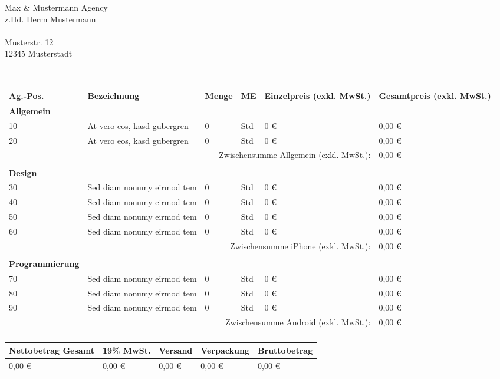 \documentclass[DIN, pagenumber=false, parskip=half,
               fromalign=right, fromphone=true, fromfax=false,
               fromrule=false]{scrlttr2}
\begin{document}
\begin{letter}{
	Max \& Mustermann Agency\\
	z.Hd. Herrn Mustermann\\ \ \\
	Musterstr. 12\\
	12345 Musterstadt
}

\opening{\ }
\vspace{-1.5cm}

\begin{longtable}{p{2.5cm}p{5.5cm}p{1cm}p{1cm}p{2.5cm}p{2.5cm}}
	\hline
	Ag.-Pos. & Bezeichnung & Menge & ME & Einzelpreis (exkl. MwSt.) & Gesamtpreis (exkl. MwSt.)\\
	\hline

	\textbf{Allgemein}\\
	10 & At vero eos, kasd gubergren & 0 & Std & 0 \euro{} & 0,00 \euro{}\\
	20 & At vero eos, kasd gubergren  & 0 & Std & 0 \euro{} & 0,00 \euro{}\\
	\multicolumn{5}{r}{Zwischensumme Allgemein (exkl. MwSt.):} & 0,00 \euro{}\\
	\\

	\textbf{Design}\\
	30 & Sed diam nonumy eirmod tem & 0 & Std & 0 \euro{} & 0,00 \euro{}\\
	40 & Sed diam nonumy eirmod tem & 0 & Std & 0 \euro{} & 0,00 \euro{}\\
	50 & Sed diam nonumy eirmod tem & 0 & Std & 0 \euro{} & 0,00 \euro{}\\
	60 & Sed diam nonumy eirmod tem & 0 & Std & 0 \euro{} & 0,00 \euro{}\\
	\multicolumn{5}{r}{Zwischensumme iPhone (exkl. MwSt.):} & 0,00 \euro{}\\
	\\

	\textbf{Programmierung}\\
	70 & Sed diam nonumy eirmod tem & 0 & Std & 0 \euro{} & 0,00 \euro{}\\
	80 & Sed diam nonumy eirmod tem & 0 & Std & 0 \euro{} & 0,00 \euro{}\\
	90 & Sed diam nonumy eirmod tem & 0 & Std & 0 \euro{} & 0,00 \euro{}\\
	\multicolumn{5}{r}{Zwischensumme Android (exkl. MwSt.):} & 0,00 \euro{}\\
	\\

	\hline\hline
\end{longtable}


\begin{longtable}{p{5.5cm}p{2.5cm}p{2.5cm}p{2cm}p{3cm}}
	\hline Nettobetrag Gesamt & 19\% MwSt. & Versand & Verpackung & Bruttobetrag\\
	\hline
	0,00 \euro{} & 0,00 \euro & 0,00 \euro & 0,00 \euro & 0,00 \euro{}\\
	\hline
	\hline
\end{longtable}


\end{letter}
\end{document}
